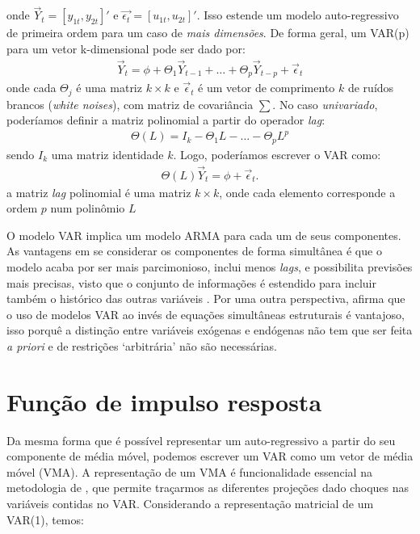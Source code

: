 \noindent
onde $\Vec{Y}_t=[ y_{1t}, y_{2t}]'$ e $\Vec{\epsilon_t}=[u_{1t}, u_{2t}]'$. Isso estende um modelo auto-regressivo de primeira ordem para um caso de \textit{mais dimensões}. De forma geral, um VAR(p) para um vetor k-dimensional pode ser dado por:
\begin{align*}
    \Vec{Y}_t = \phi + \Theta_1 \Vec{Y}_{t-1} + \dots + \Theta_p \Vec{Y}_{t-p} + \Vec{\epsilon}_t
\end{align*}
\noindent
onde cada $\Theta_j$ é uma matriz $k \times k$ e $\Vec{\epsilon}_t$ é um vetor de comprimento $k$ de ruídos brancos (\textit{white noises}), com matriz de covariância $\sum$. No caso \textit{univariado}, poderíamos definir a matriz polinomial a partir do operador \textit{lag}:
\begin{align*}
    \Theta(L) = I_k - \Theta_1 L - \dots - \Theta_p L^p
\end{align*}
\noindent
sendo $I_k$ uma matriz identidade $k$. Logo, poderíamos escrever o VAR como:
\begin{align*}
    \Theta(L)\Vec{Y}_t = \phi + \Vec{\epsilon}_t.
\end{align*}
\noindent
a matriz \textit{lag} polinomial é uma matriz $k \times k$, onde cada elemento corresponde a ordem $p$ num polinômio $L$

O modelo VAR implica um modelo ARMA para cada um de seus componentes. As vantagens em se considerar os componentes de forma simultânea é que o modelo acaba por ser mais parcimonioso, inclui menos \textit{lags}, e possibilita previsões mais precisas, visto que o conjunto de informações é estendido para incluir também o histórico das outras variáveis \cite[p.322]{verbeek2008guide}. Por uma outra perspectiva,  afirma que o uso de modelos VAR ao invés de equações simultâneas estruturais é vantajoso, isso porquê a distinção entre variáveis exógenas e endógenas não tem que ser feita \textit{a priori} e de restrições `arbitrária' não são necessárias.    

\section{Função de impulso resposta} \label{respostaimpulso}

Da mesma forma que é possível representar um auto-regressivo a partir do seu componente de média móvel, podemos escrever um VAR como um vetor de média móvel (VMA). A representação de um VMA é funcionalidade essencial na metodologia de , que permite traçarmos as diferentes projeções dado choques nas variáveis contidas no VAR. Considerando a representação matricial de um VAR(1), temos:

